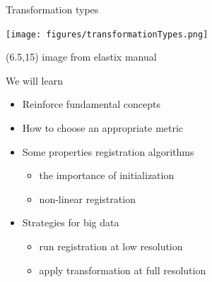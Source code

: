 \documentclass[aspectratio=169]{beamer}
\newcommand{\code}[1]{\texttt{#1}}
\newcommand\citefoot[1]{
    \begin{textblock}{12}(6.5,15)
        {\color{HHMIGrayB} \tiny #1}
    \end{textblock}
}
\begin{document}
\begin{frame}{Transformation types}

    \vspace{1.0em}
    \begin{center}
        \texttt{[image: figures/transformationTypes.png]} \\
    \end{center}

    \citefoot{image from elastix manual}
\end{frame}


%
%

\begin{frame}{We will learn}

    \begin{itemize}
        \item Reinforce fundamental concepts
        \item How to choose an appropriate metric
        \item Some properties registration algorithms
        \begin{itemize}
            \item the importance of initialization
            \item non-linear registration
        \end{itemize}
        \item Strategies for big data
        \begin{itemize}
            \item run registration at low resolution
            \item apply transformation at full resolution
        \end{itemize}
    \end{itemize}

\end{frame}
\end{document}
